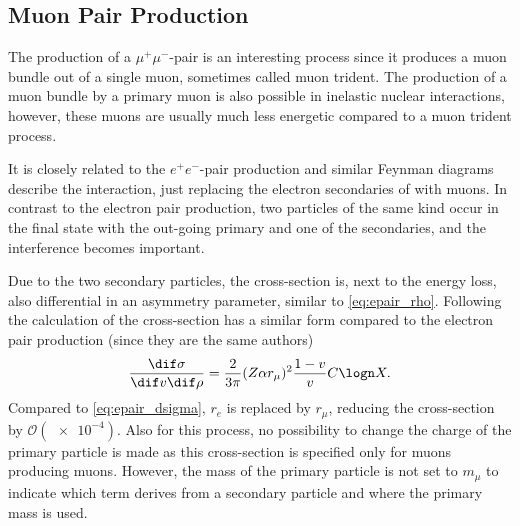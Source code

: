 \subsection{Muon Pair Production}

The production of a $\mu^+ \mu^-$-pair is an interesting process since it produces a muon bundle out of a single muon, sometimes called muon trident.
The production of a muon bundle by a primary muon is also possible in inelastic nuclear interactions, however, these muons are usually much less energetic compared to a muon trident process.

It is closely related to the $e^+e^-$-pair production and similar Feynman diagrams describe the interaction, just replacing the electron secondaries of  with muons.
In contrast to the electron pair production, two particles of the same kind occur in the final state with the out-going primary and one of the secondaries, and the interference becomes important.

Due to the two secondary particles, the cross-section is, next to the energy loss, also differential in an asymmetry parameter, similar to \eqref{eq:epair_rho}.
Following the calculation of \cite{Kelner00mupair} the cross-section has a similar form compared to the electron pair production (since they are the same authors)
\begin{align}
    \frac{\dif \sigma}{\dif v \dif \rho} =
    \frac{2}{3\pi} (Z \alpha r_\mu)^2 \frac{1 - v}{v} C \logn X .
\end{align}
Compared to \eqref{eq:epair_dsigma}, $r_e$ is replaced by $r_\mu$, reducing the cross-section by $\mathcal{O}(\num{e-4})$.
Also for this process, no possibility to change the charge of the primary particle is made as this cross-section is specified only for muons producing muons.
However, the mass of the primary particle is not set to $m_\mu$ to indicate which term derives from a secondary particle and where the primary mass is used.


